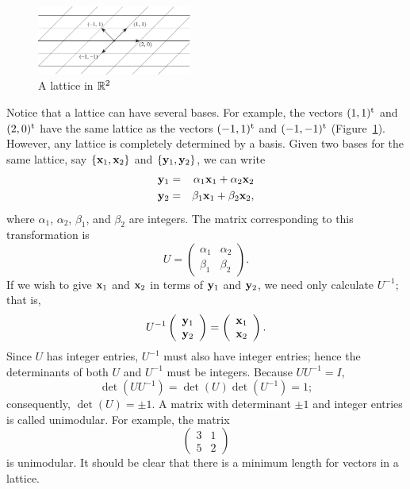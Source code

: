  
\begin{figure}[htb]
\begin{center}
\centerline {
\includegraphics[width=2in]{LatticeExample}
}
\end{center}
\caption{A lattice in  ${\Bbb R}^2$}
\label{lattice}
\end{figure}
 
 
Notice that a lattice can have several bases. For example, the vectors
$(1,1)^{\rm t}$ and $(2,0)^{\rm t}$ have the  same lattice as the
vectors $(-1, 1)^{\rm t}$ and $(-1, -1)^{\rm t}$
(Figure~\ref{lattice}). However, any lattice is completely determined
by a basis. Given two bases for the same lattice, say $\{ {\bold x}_1,
{\bold x}_2 \}$ and $\{ {\bold y}_1, {\bold y}_2 \}$, we can write 
\begin{eqnarray*}
{\bold y}_1 & = & \alpha_1  {\bold x}_1 + \alpha_2 {\bold x}_2 \\
{\bold y}_2 & = & \beta_1  {\bold x}_1 + \beta_2 {\bold x}_2,
\end{eqnarray*}
where $\alpha_1$, $\alpha_2$, $\beta_1$, and $\beta_2$ are integers.
The matrix corresponding to this transformation is 
\[
U
=
\left(
\begin{array}{cc}
\alpha_1 & \alpha_2 \\
\beta_1 & \beta_2
\end {array}
\right).
\]
If we wish to give ${\bold x}_1$ and ${\bold x}_2$ in terms of ${\bold
y}_1$ and ${\bold y}_2$, we need only calculate $U^{-1}$; that is, 
\[
U^{-1}
\left(
\begin{array}{c}
{\bold y}_1 \\
{\bold y}_2
\end{array}
\right)
=
\left(
\begin{array}{c}
{\bold x}_1 \\
{\bold x}_2
\end{array}
\right).
\]
Since $U$ has integer entries, $U^{-1}$ must also have integer
entries; hence the determinants of both $U$ and $U^{-1}$ must be
integers. Because $U U^{-1} = I$,  
\[
\det(U U^{-1}) =\det(U) \det( U^{-1}) = 1;
\]
consequently, $\det(U) = \pm 1$. A matrix with determinant $\pm 1$ and
integer entries is called {\bfi unimodular}.
For example, the matrix 
\[
\left(
\begin{array}{cc}
3 & 1 \\
5 & 2
\end{array}
\right)
\]
is unimodular. It should be clear that there is a minimum length for
vectors in a lattice.  
 
